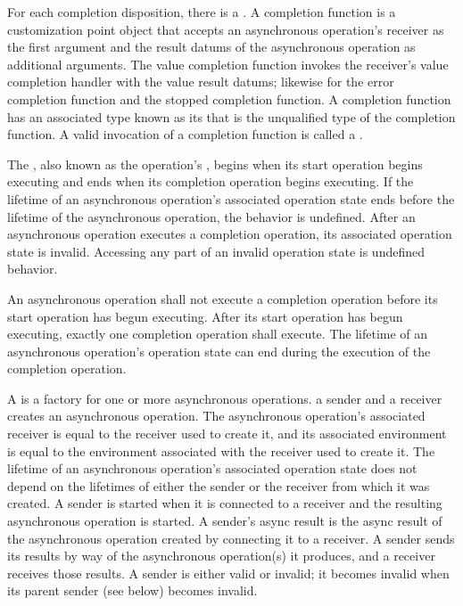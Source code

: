 \pnum
For each completion disposition, there is a .
A completion function is
a customization point object
that accepts an asynchronous operation's receiver as the first argument and
the result datums of the asynchronous operation as additional arguments.
The value completion function invokes
the receiver's value completion handler with the value result datums;
likewise for the error completion function and the stopped completion function.
A completion function has
an associated type known as its 
that is the unqualified type of the completion function.
A valid invocation of a completion function is called
a .

\pnum
The ,
also known as the operation's ,
begins when its start operation begins executing and
ends when its completion operation begins executing.
If the lifetime of an asynchronous operation's associated operation state
ends before the lifetime of the asynchronous operation,
the behavior is undefined.
After an asynchronous operation executes a completion operation,
its associated operation state is invalid.
Accessing any part of an invalid operation state is undefined behavior.

\pnum
An asynchronous operation shall not execute a completion operation
before its start operation has begun executing.
After its start operation has begun executing,
exactly one completion operation shall execute.
The lifetime of an asynchronous operation's operation state can end
during the execution of the completion operation.

\pnum
A  is a factory for one or more asynchronous operations.
 a sender and a receiver creates
an asynchronous operation.
The asynchronous operation's associated receiver is equal to
the receiver used to create it, and
its associated environment is equal to
the environment associated with the receiver used to create it.
The lifetime of an asynchronous operation's associated operation state
does not depend on the lifetimes of either the sender or the receiver
from which it was created.
A sender is started when it is connected to a receiver and
the resulting asynchronous operation is started.
A sender's async result is the async result of the asynchronous operation
created by connecting it to a receiver.
A sender sends its results by way of the asynchronous operation(s) it produces,
and a receiver receives those results.
A sender is either valid or invalid;
it becomes invalid when its parent sender (see below) becomes invalid.

